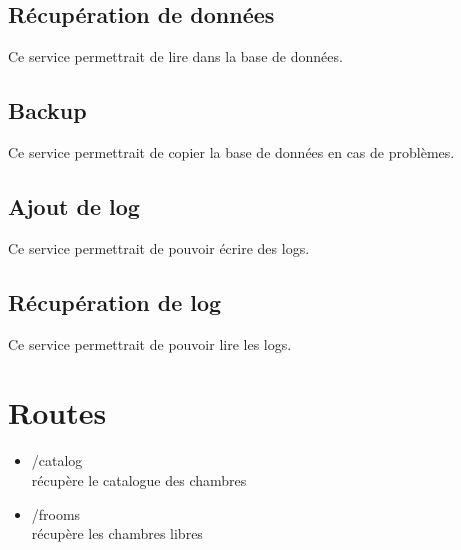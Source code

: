 \documentclass{article}
\begin{document}
\subsection{R\'ecup\'eration de donn\'ees}
Ce service permettrait de lire dans la base de donn\'ees.

\subsection{Backup}
Ce service permettrait de copier la base de donn\'ees en cas de probl\`emes.

\subsection{Ajout de log}
Ce service permettrait de pouvoir \'ecrire des logs.

\subsection{R\'ecup\'eration de log}
Ce service permettrait de pouvoir lire les logs.

\section{Routes}
\begin{itemize}
	\item /catalog\\
	r\'ecup\`ere le catalogue des chambres
	\item /frooms\\
	r\'ecup\`ere les chambres libres
\end{itemize}
\end{document}
